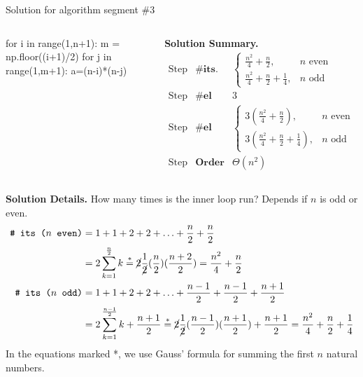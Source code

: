 \documentclass[10pt]{beamer}
\begin{document}
\begin{frame}[fragile]{Solution for algorithm segment \#3}
\footnotesize 

\setlength{\columnsep}{0pt} %

\begin{columns}[c]
 	\begin{python}[basicstyle=\ttfamily\tiny, numbers=none, columns=fullflexible, keepspaces=true]
	for i in range(1,n+1):
		m = np.floor((i+1)/2)
		for j in range(1,m+1):
    		a=(n-i)*(n-j)
   	\end{python}
    \colorbox{green!30}{\textbf{Solution Summary.}} \\[0.3em]
    \[
    \begin{array}{lll}
    \text{Step 1} & \textbf{\# its.} & \begin{cases}
       \frac{n^2}{4} + \frac{n}{2}, & \text{$n$ even} \\
    \frac{n^2}{4} + \frac{n}{2} + \frac{1}{4}, & \text{$n$ odd} 
    \end{cases} \\
    \text{Step 2} & \textbf{\# el ops. per it.} & 3 \\
    \text{Step 3} & \textbf{\# el ops.} & \begin{cases}
        3\left(\frac{n^2}{4} + \frac{n}{2}\right), & \text{$n$ even}\\
    3\left(\frac{n^2}{4} + \frac{n}{2} + \frac{1}{4}\right), & \text{$n$ odd} 
    \end{cases} \\
    \text{Step 4} & \textbf{Order} & \Theta(n^2)
    \end{array}
    \]
\end{columns}


\colorbox{red!30}{\textbf{Solution Details.}}
How many times is the inner loop run? 
Depends if $n$ is odd or even.
 \begin{align*}
 \texttt{\# its ($n$ even)} & = 1+1 + 2 +2 + \hdots + \frac{n}{2} + \frac{n}{2} \\
&= 2 \sum_{k=1}^{\frac{n}{2}} k  \stackrel{*}{=} \cancel{2} \frac{1}{\cancel{2}} (\frac{n}{2})(\frac{n+2}{2}) =    \frac{n^2}{4} + \frac{n}{2} \\
\texttt{\# its ($n$ odd)} & = 1+1 + 2 +2 + \hdots + \frac{n-1}{2} + \frac{n-1}{2} + \frac{n+1}{2} \\
&= 2 \sum_{k=1}^{\frac{n-1}{2}} k + \frac{n+1}{2} \stackrel{*}{=} \cancel{2} \frac{1}{\cancel{2}} (\frac{n-1}{2})(\frac{n+1}{2}) + \frac{n+1}{2} =  \frac{n^2}{4} + \frac{n}{2} + \frac{1}{4} 
 \end{align*}
%
In the equations marked *, we use Gauss' formula for summing the first $n$ natural numbers. 
\end{frame}
\end{document}
